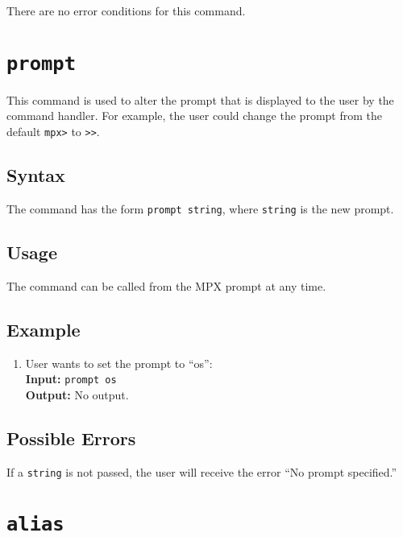 There are no error conditions for this command.








\section{\tt prompt}
\label{prompt_cmd}

This command is used to alter the prompt that is displayed to the user by the command 
handler. For example, the user could change the prompt from the default {\tt mpx>} to
{\tt >>}.

\subsection{Syntax}

The command has the form {\tt prompt string}, where {\tt string} is the new prompt.

\subsection{Usage}

The command can be called from the MPX prompt at any time.

\subsection{Example}
\begin{enumerate}
    \item User wants to set the prompt to ``os'': \\
        {\bf Input:} {\tt prompt os} \\
        {\bf Output:} No output.
\end{enumerate}

\subsection{Possible Errors}

If a {\tt string} is not passed, the user will receive the error ``No prompt specified.''








\section{\tt alias}
\label{alias_cmd}

